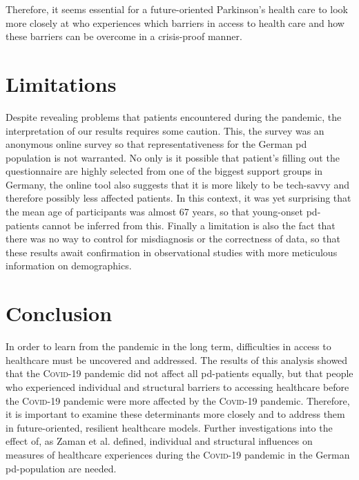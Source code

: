 \documentclass{bmcart}
\begin{document}

Therefore, it seems essential for a future-oriented Parkinson's health care to look more closely at who experiences which barriers in access to health care and how these barriers can be overcome in a crisis-proof manner. 

\section*{Limitations}
Despite revealing problems that patients encountered during the pandemic, the interpretation of our results requires some caution. This, the survey was an anonymous online survey so that representativeness for the German \ac{pd} population is not warranted. No only is it possible that patient's filling out the questionnaire are highly selected from one of the biggest support groups in Germany, the online tool also suggests that it is more likely to be tech-savvy and therefore possibly less affected patients. In this context, it was yet surprising that the mean age of participants was almost 67 years, so that young-onset \ac{pd}-patients cannot be inferred from this. Finally a limitation is also the fact that there was no way to control for misdiagnosis or the correctness of data, so that these results await confirmation in observational studies with more meticulous information on demographics.


\section*{Conclusion}
In order to learn from the pandemic in the long term, difficulties in access to healthcare must be uncovered and addressed. The results of this analysis showed that the \textsc{Covid}-19 pandemic did not affect all \ac{pd}-patients equally, but that people who experienced individual and structural barriers to accessing healthcare before the \textsc{Covid}-19 pandemic were more affected by the \textsc{Covid}-19 pandemic. Therefore, it is important to examine these determinants more closely and to address them in future-oriented, resilient healthcare models. Further investigations into the effect of, as Zaman et al. defined, individual and structural influences on  measures of healthcare experiences during the \textsc{Covid}-19 pandemic in the German \ac{pd}-population are needed.
\end{document}
